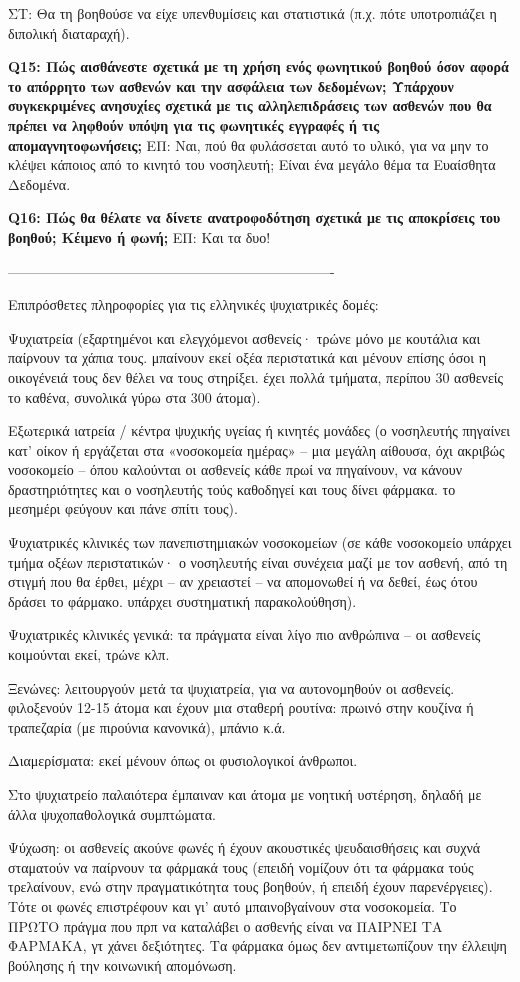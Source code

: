 ΣΤ: Θα τη βοηθούσε να είχε υπενθυμίσεις και στατιστικά (π.χ. πότε υποτροπιάζει η διπολική διαταραχή).

\textbf{Q15:	Πώς αισθάνεστε σχετικά με τη χρήση ενός φωνητικού βοηθού όσον αφορά το απόρρητο των ασθενών και την ασφάλεια των δεδομένων; Υπάρχουν συγκεκριμένες ανησυχίες σχετικά με τις αλληλεπιδράσεις των ασθενών που θα πρέπει να ληφθούν υπόψη για τις φωνητικές εγγραφές ή τις απομαγνητοφωνήσεις;}
ΕΠ: Ναι, πού θα φυλάσσεται αυτό το υλικό, για να μην το κλέψει κάποιος από το κινητό του νοσηλευτή; Είναι ένα μεγάλο θέμα τα Ευαίσθητα Δεδομένα.


\textbf{Q16:	Πώς θα θέλατε να δίνετε ανατροφοδότηση σχετικά με τις αποκρίσεις του βοηθού; Kέιμενο ή φωνή;} 
ΕΠ: Και τα δυο!


----------------------------------------------------------------------

Επιπρόσθετες πληροφορίες για τις ελληνικές ψυχιατρικές δομές:

Ψυχιατρεία (εξαρτημένοι και ελεγχόμενοι ασθενείς· τρώνε μόνο με κουτάλια και παίρνουν τα χάπια τους. μπαίνουν εκεί οξέα περιστατικά και μένουν επίσης όσοι η οικογένειά τους δεν θέλει να τους στηρίξει. έχει πολλά τμήματα, περίπου 30 ασθενείς το καθένα, συνολικά γύρω στα 300 άτομα).

Εξωτερικά ιατρεία / κέντρα ψυχικής υγείας ή κινητές μονάδες (ο νοσηλευτής πηγαίνει κατ’ οίκον ή εργάζεται στα «νοσοκομεία ημέρας» – μια μεγάλη αίθουσα, όχι ακριβώς νοσοκομείο – όπου καλούνται οι ασθενείς κάθε πρωί να πηγαίνουν, να κάνουν δραστηριότητες και ο νοσηλευτής τούς καθοδηγεί και τους δίνει φάρμακα. το μεσημέρι φεύγουν και πάνε σπίτι τους).

Ψυχιατρικές κλινικές των πανεπιστημιακών νοσοκομείων (σε κάθε νοσοκομείο υπάρχει τμήμα οξέων περιστατικών· ο νοσηλευτής είναι συνέχεια μαζί με τον ασθενή, από τη στιγμή που θα έρθει, μέχρι – αν χρειαστεί – να απομονωθεί ή να δεθεί, έως ότου δράσει το φάρμακο. υπάρχει συστηματική παρακολούθηση).

Ψυχιατρικές κλινικές γενικά: τα πράγματα είναι λίγο πιο ανθρώπινα – οι ασθενείς κοιμούνται εκεί, τρώνε κλπ.

Ξενώνες: λειτουργούν μετά τα ψυχιατρεία, για να αυτονομηθούν οι ασθενείς. φιλοξενούν 12-15 άτομα και έχουν μια σταθερή ρουτίνα: πρωινό στην κουζίνα ή τραπεζαρία (με πιρούνια κανονικά), μπάνιο κ.ά.

Διαμερίσματα: εκεί μένουν όπως οι φυσιολογικοί άνθρωποι.

Στο ψυχιατρείο παλαιότερα έμπαιναν και άτομα με νοητική υστέρηση, δηλαδή με άλλα ψυχοπαθολογικά συμπτώματα.

Ψύχωση: οι ασθενείς ακούνε φωνές ή έχουν ακουστικές ψευδαισθήσεις και συχνά σταματούν να παίρνουν τα φάρμακά τους (επειδή νομίζουν ότι τα φάρμακα τούς τρελαίνουν, ενώ στην πραγματικότητα τους βοηθούν, ή επειδή έχουν παρενέργειες). Τότε οι φωνές επιστρέφουν και γι’ αυτό μπαινοβγαίνουν στα νοσοκομεία. Το ΠΡΩΤΟ πράγμα που πρπ να  καταλάβει ο ασθενής είναι να ΠΑΙΡΝΕΙ ΤΑ ΦΑΡΜΑΚΑ, γτ χάνει δεξιότητες.
Τα φάρμακα όμως δεν αντιμετωπίζουν την έλλειψη βούλησης ή την κοινωνική απομόνωση.








